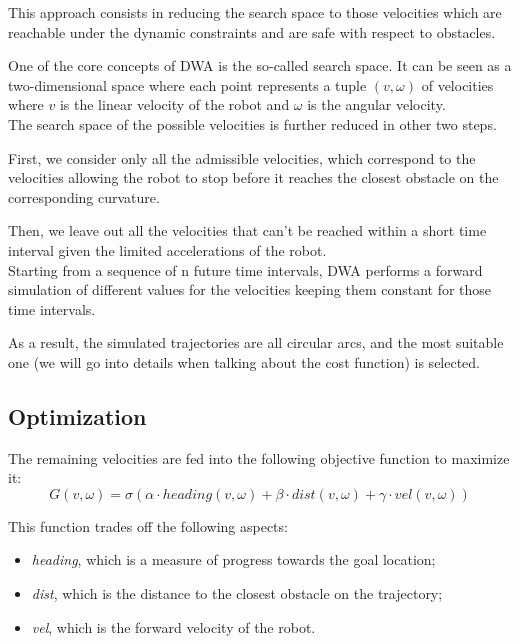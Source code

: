 \documentclass[11pt,a4paper]{article}
\begin{document}
This approach consists in reducing the search space to those velocities which are reachable under the dynamic constraints and are safe with respect to obstacles.

One of the core concepts of DWA is the so-called search space. It can be seen as a two-dimensional space where each point represents a tuple $(v, \omega)$ of velocities where $v$ is the linear velocity of the robot and $\omega$ is the angular velocity.\\

The search space of the possible velocities is further reduced in other two steps.

First, we consider only all the admissible velocities, which correspond to the velocities allowing the robot to stop before it reaches the closest obstacle on the corresponding curvature.

Then, we leave out all the velocities that can't be reached within a short time interval
given the limited accelerations of the robot.\\

Starting from a sequence of n future time intervals, DWA performs a forward simulation of different values for the velocities keeping them constant for those time intervals.

As a result, the simulated trajectories are all circular arcs, and the most suitable one (we will go into details when talking about the cost function) is selected.

\subsection{Optimization}

The remaining velocities are fed into the following objective function to maximize it:
$$ G(v, \omega) = \sigma(\alpha \cdot heading(v, \omega) + \beta \cdot dist(v, \omega) + \gamma \cdot vel(v, \omega)) $$

This function trades off the following aspects:
\begin{itemize}
 \item \textit{heading}, which is a measure of progress towards the goal location;
 \item \textit{dist}, which is the distance to the closest obstacle on the trajectory;
 \item \textit{vel}, which is the forward velocity of the robot.\\
\end{itemize}
\end{document}
